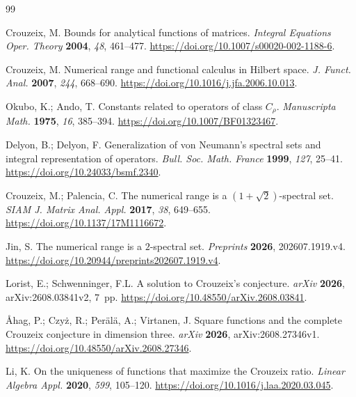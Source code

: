 \documentclass[preprints,article,submit,oneauthor]{Definitions/mdpi}
\numberwithin{equation}{section}
\begin{document}

\begin{thebibliography}{99}

Crouzeix, M. Bounds for analytical functions of matrices.
\emph{Integral Equations Oper. Theory} \textbf{2004}, \emph{48}, 461--477.
\url{https://doi.org/10.1007/s00020-002-1188-6}.

Crouzeix, M. Numerical range and functional calculus in Hilbert space.
\emph{J. Funct. Anal.} \textbf{2007}, \emph{244}, 668--690.
\url{https://doi.org/10.1016/j.jfa.2006.10.013}.

Okubo, K.; Ando, T. Constants related to operators of class \(C_{\rho}\).
\emph{Manuscripta Math.} \textbf{1975}, \emph{16}, 385--394.
\url{https://doi.org/10.1007/BF01323467}.

Delyon, B.; Delyon, F. Generalization of von Neumann's spectral sets and
integral representation of operators. \emph{Bull. Soc. Math. France}
\textbf{1999}, \emph{127}, 25--41.
\url{https://doi.org/10.24033/bsmf.2340}.

Crouzeix, M.; Palencia, C. The numerical range is a
\((1+\sqrt{2})\)-spectral set. \emph{SIAM J. Matrix Anal. Appl.}
\textbf{2017}, \emph{38}, 649--655.
\url{https://doi.org/10.1137/17M1116672}.

Jin, S. The numerical range is a \(2\)-spectral set.
\emph{Preprints} \textbf{2026}, 202607.1919.v4.
\url{https://doi.org/10.20944/preprints202607.1919.v4}.

Lorist, E.; Schwenninger, F.L. A solution to Crouzeix's conjecture.
\emph{arXiv} \textbf{2026}, arXiv:2608.03841v2, 7~pp.
\url{https://doi.org/10.48550/arXiv.2608.03841}.

{\AA}hag, P.; Czy\.z, R.; Per\"al\"a, A.; Virtanen, J.
Square functions and the complete Crouzeix conjecture in dimension three.
\emph{arXiv} \textbf{2026}, arXiv:2608.27346v1.
\url{https://doi.org/10.48550/arXiv.2608.27346}.

Li, K. On the uniqueness of functions that maximize the Crouzeix ratio.
\emph{Linear Algebra Appl.} \textbf{2020}, \emph{599}, 105--120.
\url{https://doi.org/10.1016/j.laa.2020.03.045}.


\end{thebibliography}
\end{document}

